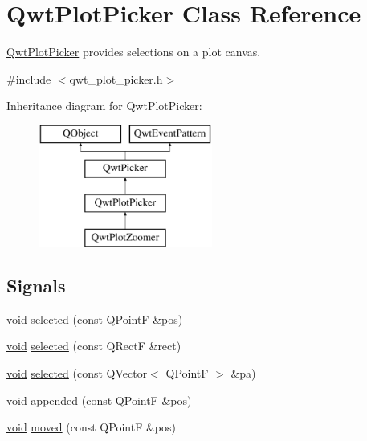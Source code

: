\hypertarget{class_qwt_plot_picker}{\section{Qwt\-Plot\-Picker Class Reference}
\label{class_qwt_plot_picker}
}


\hyperlink{class_qwt_plot_picker}{Qwt\-Plot\-Picker} provides selections on a plot canvas.  




{\ttfamily \#include $<$qwt\-\_\-plot\-\_\-picker.\-h$>$}

Inheritance diagram for Qwt\-Plot\-Picker\-:\begin{figure}[H]
\begin{center}
\leavevmode
\includegraphics[height=4.000000cm]{class_qwt_plot_picker}
\end{center}
\end{figure}
\subsection*{Signals}
\begin{DoxyCompactItemize}
\item 
\hyperlink{group___u_a_v_objects_plugin_ga444cf2ff3f0ecbe028adce838d373f5c}{void} \hyperlink{class_qwt_plot_picker_a28f6c8af0efd0abb6dc144670efbb31b}{selected} (const Q\-Point\-F \&pos)
\item 
\hyperlink{group___u_a_v_objects_plugin_ga444cf2ff3f0ecbe028adce838d373f5c}{void} \hyperlink{class_qwt_plot_picker_ace55ce208052c631ce666b5af2b7342b}{selected} (const Q\-Rect\-F \&rect)
\item 
\hyperlink{group___u_a_v_objects_plugin_ga444cf2ff3f0ecbe028adce838d373f5c}{void} \hyperlink{class_qwt_plot_picker_a7eb9fdda3166c452660130ceffd1d092}{selected} (const Q\-Vector$<$ Q\-Point\-F $>$ \&pa)
\item 
\hyperlink{group___u_a_v_objects_plugin_ga444cf2ff3f0ecbe028adce838d373f5c}{void} \hyperlink{class_qwt_plot_picker_a558f8fdf8645e202bd5324b766b445f7}{appended} (const Q\-Point\-F \&pos)
\item 
\hyperlink{group___u_a_v_objects_plugin_ga444cf2ff3f0ecbe028adce838d373f5c}{void} \hyperlink{class_qwt_plot_picker_a4a35d30f1c4c4f80c49e3c6647b34e12}{moved} (const Q\-Point\-F \&pos)
\end{DoxyCompactItemize}
